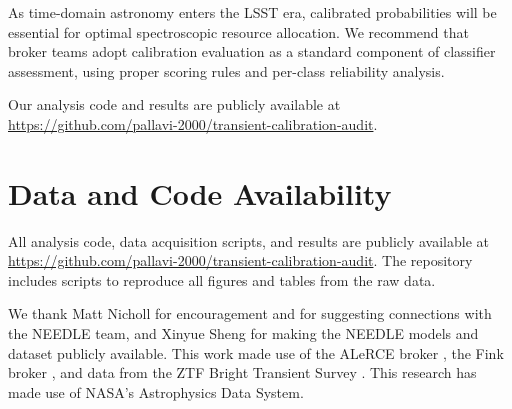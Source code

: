 \documentclass[twocolumn]{aastex631}
\begin{document}
As time-domain astronomy enters the LSST era, calibrated probabilities will be essential for optimal spectroscopic resource allocation. We recommend that broker teams adopt calibration evaluation as a standard component of classifier assessment, using proper scoring rules and per-class reliability analysis.

Our analysis code and results are publicly available at \url{https://github.com/pallavi-2000/transient-calibration-audit}.

\section*{Data and Code Availability}

All analysis code, data acquisition scripts, and results are publicly available at \url{https://github.com/pallavi-2000/transient-calibration-audit}. The repository includes scripts to reproduce all figures and tables from the raw data.

\begin{acknowledgments}
We thank Matt Nicholl for encouragement and for suggesting connections with the NEEDLE team, and Xinyue Sheng for making the NEEDLE models and dataset publicly available. This work made use of the ALeRCE broker \citep{forster2021}, the Fink broker \citep{moller2021}, and data from the ZTF Bright Transient Survey \citep{fremling2020, perley2020}. This research has made use of NASA's Astrophysics Data System.
\end{acknowledgments}






\end{document}
